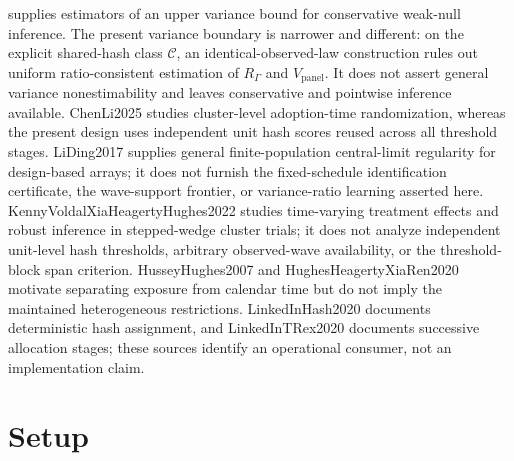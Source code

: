 \documentclass{article}
\begin{document}
supplies estimators of an upper variance bound for conservative weak-null inference. The present variance boundary is narrower and different: on the explicit shared-hash class \(\mathcal C\), an identical-observed-law construction rules out uniform ratio-consistent estimation of \(R_\Gamma\) and \(V_{\mathrm{panel}}\). It does not assert general variance nonestimability and leaves conservative and pointwise inference available. ChenLi2025 studies cluster-level adoption-time randomization, whereas the present design uses independent unit hash scores reused across all threshold stages. LiDing2017 supplies general finite-population central-limit regularity for design-based arrays; it does not furnish the fixed-schedule identification certificate, the wave-support frontier, or variance-ratio learning asserted here. KennyVoldalXiaHeagertyHughes2022 studies time-varying treatment effects and robust inference in stepped-wedge cluster trials; it does not analyze independent unit-level hash thresholds, arbitrary observed-wave availability, or the threshold-block span criterion. HusseyHughes2007 and HughesHeagertyXiaRen2020 motivate separating exposure from calendar time but do not imply the maintained heterogeneous restrictions. LinkedInHash2020 documents deterministic hash assignment, and LinkedInTRex2020 documents successive allocation stages; these sources identify an operational consumer, not an implementation claim.

\section{Setup}
\end{document}
